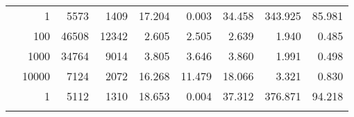 \begin{table}
\begin{tabular}{rrrrrrrrr}
	            
	        
				\noalign{\smallskip}\hline
				\multirow{ 4 }{*}{ 80000 } &
				
					
					 
					\multirow{ 1 }{*}{ 1 } &
					
						
							    
							     5573  & 1409  
	                           & 17.204 & 0.003 & 34.458
	                           & 343.925 & 85.981  \\
	                
	            
					 &  
					 
					\multirow{ 1 }{*}{ 100 } &
					
						
							    
							     46508  & 12342  
	                           & 2.605 & 2.505 & 2.639
	                           & 1.940 & 0.485  \\
	                
	            
					 &  
					 
					\multirow{ 1 }{*}{ 1000 } &
					
						
							    
							     34764  & 9014  
	                           & 3.805 & 3.646 & 3.860
	                           & 1.991 & 0.498  \\
	                
	            
					 &  
					 
					\multirow{ 1 }{*}{ 10000 } &
					
						
							    
							     7124  & 2072  
	                           & 16.268 & 11.479 & 18.066
	                           & 3.321 & 0.830  \\
	                
	            
	        
				\noalign{\smallskip}\hline
				\multirow{ 4 }{*}{ 160000 } &
				
					
					 
					\multirow{ 1 }{*}{ 1 } &
					
						
							    
							     5112  & 1310  
	                           & 18.653 & 0.004 & 37.312
	                           & 376.871 & 94.218  \\
	                
	            
					 &  
					 

\end{tabular}
\end{table}
